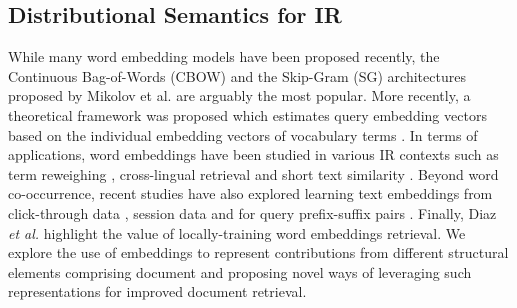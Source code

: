 \documentclass[runningheads,a4paper]{llncs}
\begin{document}
\subsection{Distributional Semantics for IR}
While many word embedding models have been proposed recently, the Continuous 
Bag-of-Words (CBOW) and the Skip-Gram
(SG) architectures proposed by Mikolov et al. \cite{mikolov2013distributed} are 
arguably the most popular. More recently, a theoretical framework was proposed 
which estimates query embedding vectors based on the individual embedding 
vectors of vocabulary terms \cite{zamani2016estimating}. In terms of 
applications, word embeddings have been studied in various IR contexts such as 
term reweighing \cite{zheng2015learning}, cross-lingual retrieval 
\cite{vulic2015monolingual} and short text similarity 
\cite{kenter2015short}. Beyond word co-occurrence, recent studies have also 
explored learning text embeddings from click-through data 
\cite{shen2014learning}, session data \cite{grbovic2015context} and for query 
prefix-suffix pairs \cite{mitra2015query}. Finally, Diaz \textit{et al.} 
\cite{diaz2016query} highlight the value of locally-training word embeddings retrieval. 
We explore the use of embeddings to represent 
contributions from different structural elements comprising document and 
proposing novel ways of leveraging such representations for improved document 
retrieval.

\end{document}
